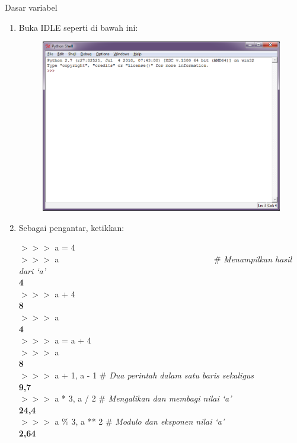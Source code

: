 \begin{panduan}{Dasar variabel}
\begin{enumerate}
	\item Buka IDLE seperti di bawah ini:
	\begin{figure}[H]%
		\centering
		\includegraphics[scale=0.6]{fig/IDLE.eps}%
	\end{figure}
	\item Sebagai pengantar, ketikkan: 
	\begin{IDLE}
		\begin{tabbing}
		$>>>$ a = 4\\
		$>>>$ a ~~~~~~~~~~~~~~~~~~~~~~~~~~~~~~~~~~~~ \= \# \textit{Menampilkan hasil dari `a'}\\
		\textbf{4}\\
		$>>>$ a + 4\\
		\textbf{8}\\
		$>>>$ a\\
		\textbf{4}\\
		$>>>$ a = a + 4\\
		$>>>$ a\\
		\textbf{8}\\
		$>>>$ a + 1, a - 1\> \# \textit{Dua perintah dalam satu baris sekaligus}\\
		\textbf{9,7}\\
		$>>>$ a * 3, a / 2 \> \# \textit{Mengalikan dan membagi nilai `a'}\\
		\textbf{24,4}\\
		$>>>$ a \% 3, a ** 2 \> \# \textit{Modulo dan eksponen nilai `a'}\\
		\textbf{2,64}\\

\end{tabbing}
\end{IDLE}
\end{enumerate}
\end{panduan}

